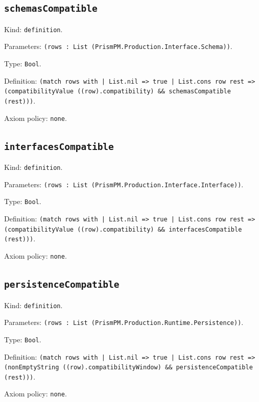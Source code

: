 \documentclass[11pt]{article}
\begin{document}
\subsection*{\texttt{schemasCompatible}}
\noindent Kind: \texttt{definition}.\par
\noindent Parameters: \texttt{(rows : List (PrismPM.Production.Interface.Schema))}.\par
\noindent Type: \texttt{Bool}.\par
\noindent Definition: \texttt{(match rows with | List.nil => true | List.cons row rest => (compatibilityValue ((row).compatibility) \&\& schemasCompatible (rest)))}.\par
\noindent Axiom policy: \texttt{none}.\par
\subsection*{\texttt{interfacesCompatible}}
\noindent Kind: \texttt{definition}.\par
\noindent Parameters: \texttt{(rows : List (PrismPM.Production.Interface.Interface))}.\par
\noindent Type: \texttt{Bool}.\par
\noindent Definition: \texttt{(match rows with | List.nil => true | List.cons row rest => (compatibilityValue ((row).compatibility) \&\& interfacesCompatible (rest)))}.\par
\noindent Axiom policy: \texttt{none}.\par
\subsection*{\texttt{persistenceCompatible}}
\noindent Kind: \texttt{definition}.\par
\noindent Parameters: \texttt{(rows : List (PrismPM.Production.Runtime.Persistence))}.\par
\noindent Type: \texttt{Bool}.\par
\noindent Definition: \texttt{(match rows with | List.nil => true | List.cons row rest => (nonEmptyString ((row).compatibilityWindow) \&\& persistenceCompatible (rest)))}.\par
\noindent Axiom policy: \texttt{none}.\par
\end{document}
